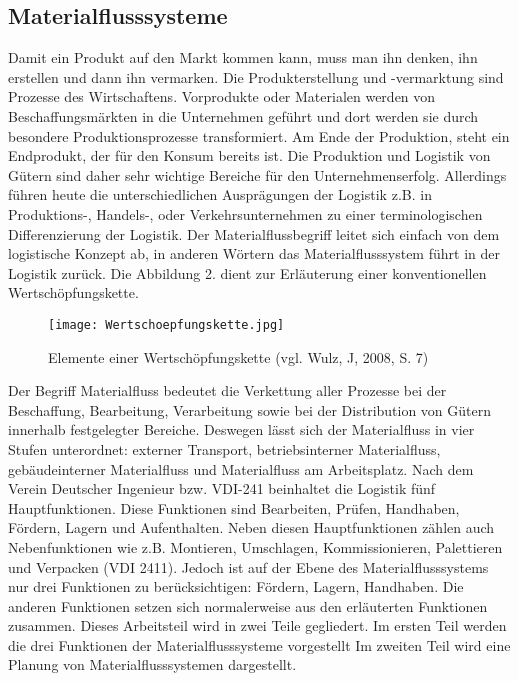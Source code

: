 \subsection{Materialflusssysteme}
Damit ein Produkt auf den Markt kommen kann, muss man ihn denken, ihn erstellen und dann ihn vermarken. Die Produkterstellung und -vermarktung sind Prozesse des Wirtschaftens. Vorprodukte oder Materialen werden von Beschaffungsm\"arkten in die Unternehmen gef\"uhrt und dort werden sie durch besondere Produktionsprozesse transformiert. Am Ende der Produktion, steht ein Endprodukt, der f\"ur den Konsum bereits ist. 
Die Produktion und Logistik von G\"utern sind daher sehr wichtige Bereiche f\"ur den Unternehmenserfolg. Allerdings f\"uhren heute die unterschiedlichen Auspr\"agungen der Logistik z.B. in Produktions-, Handels-, oder Verkehrsunternehmen zu einer terminologischen Differenzierung der Logistik. Der Materialflussbegriff leitet sich einfach von dem logistische Konzept ab, in anderen W\"ortern das Materialflusssystem f\"uhrt in der Logistik zur\"uck. Die Abbildung 2. dient zur Erl\"auterung einer konventionellen Wertsch\"opfungskette. 
	\begin{figure}[h!]
		\centering
		\texttt{[image: Wertschoepfungskette.jpg]}
	\caption{Elemente einer Wertsch\"opfungskette (vgl. Wulz, J, 2008, S. 7)}
	\label{Wertschoepfungskette}
\end{figure}

Der Begriff Materialfluss bedeutet die Verkettung aller Prozesse bei der Beschaffung, Bearbeitung, Verarbeitung sowie bei der Distribution von G\"utern innerhalb festgelegter Bereiche. Deswegen l\"asst sich der Materialfluss in vier Stufen unterordnet: externer Transport, betriebsinterner Materialfluss, geb\"audeinterner Materialfluss und Materialfluss am Arbeitsplatz. Nach dem Verein Deutscher Ingenieur bzw. VDI-241 beinhaltet die Logistik f\"unf Hauptfunktionen. Diese Funktionen sind Bearbeiten, Pr\"ufen, Handhaben, F\"ordern, Lagern und Aufenthalten. Neben diesen Hauptfunktionen z\"ahlen auch Nebenfunktionen wie z.B. Montieren, Umschlagen, Kommissionieren, Palettieren und Verpacken (VDI 2411). Jedoch ist auf der Ebene des Materialflusssystems nur drei Funktionen zu ber\"ucksichtigen: F\"ordern, Lagern, Handhaben. Die anderen Funktionen setzen sich normalerweise aus den erl\"auterten Funktionen zusammen. Dieses Arbeitsteil wird in zwei Teile gegliedert. Im ersten Teil werden die drei Funktionen der Materialflusssysteme vorgestellt Im zweiten Teil wird eine Planung von Materialflusssystemen dargestellt.

